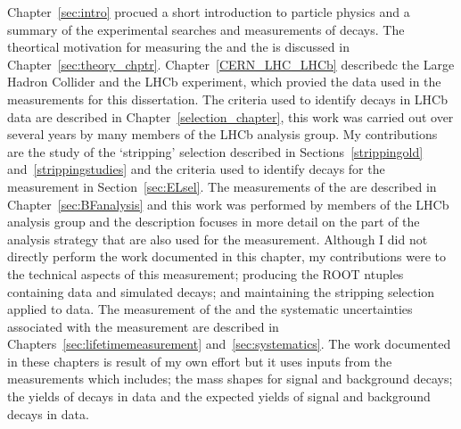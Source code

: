 Chapter~\ref{sec:intro} procued a short introduction to particle physics and a summary of the experimental searches and measurements of \bmumu decays. The theortical motivation for measuring the \bmumu \BFs and the \bsmumu \el is discussed in Chapter~\ref{sec:theory_chptr}.
Chapter~\ref{CERN_LHC_LHCb} describedc the Large Hadron Collider and the LHCb experiment, which provied the data used in the measurements for this dissertation.
The criteria used to identify \bmumu decays in LHCb data are described in Chapter~\ref{selection_chapter}, this work was carried out over several years by many members of the \bmumu LHCb analysis group. My contributions are the study of the `stripping' selection described in Sections~\ref{strippingold} and~\ref{strippingstudies} and the criteria used to identify \bsmumu decays for the \el measurement in Section~\ref{sec:ELsel}.
The measurements of the \bmumu \BFs are described in Chapter~\ref{sec:BFanalysis} and this work was performed by members of the \bmumu LHCb analysis group and the description focuses in more detail on the part of the analysis strategy that are also used for the \el measurement. Although I did not directly perform the work documented in this chapter, my contributions were to the technical aspects of this measurement; producing the ROOT ntuples containing data and simulated decays; and maintaining the stripping selection applied to data. 
The measurement of the \bsmumu \el and the systematic uncertainties associated with the measurement are described in Chapters~\ref{sec:lifetimemeasurement} and~\ref{sec:systematics}. 
The work documented in these chapters is result of my own effort but it uses inputs from the \BF measurements which includes; the mass shapes for signal and background decays; the yields of \bsjpsiphi decays in data and the expected yields of signal and background decays in data. %


